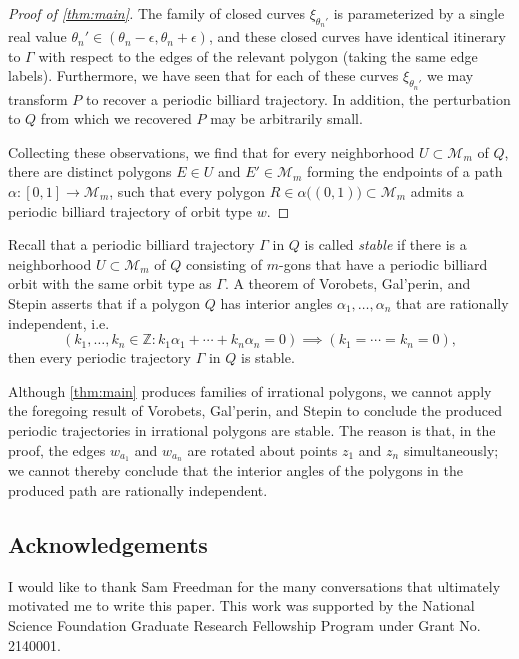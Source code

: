 \documentclass[12pt]{amsart}
\theoremstyle{theorem}
\theoremstyle{remark}
\numberwithin{equation}{section}
\newcommand{\ZZ}{\mathbb{Z}}
\newcommand{\cM}{\mathcal{M}}
\begin{document}
\begin{proof}[Proof of \cref{thm:main}]
The family of closed curves $\xi_{\theta_n'}$ is parameterized by a single real value $\theta_n' \in (\theta_n - \epsilon, \theta_n + \epsilon)$, and these closed curves have identical itinerary to $\Gamma$ with respect to the edges of the relevant polygon (taking the same edge labels). Furthermore, we have seen that for each of these curves $\xi_{\theta_n'}$ we may transform $P$ to recover a periodic billiard trajectory. In addition, the perturbation to $Q$ from which we recovered $P$ may be arbitrarily small.

Collecting these observations, we find that for every neighborhood $U \subset \cM_m$ of $Q$, there are distinct polygons $E \in U$ and $E' \in \cM_m$ forming the endpoints of a path $\alpha:[0,1]\rightarrow \cM_m$, such that every polygon $R \in \alpha\bigl((0,1)\bigr)\subset \cM_m$ admits a periodic billiard trajectory of orbit type $w$.
\end{proof}

Recall that a periodic billiard trajectory $\Gamma$ in $Q$ is called \emph{stable} if there is a neighborhood $U \subset \cM_m$ of $Q$ consisting of $m$-gons that have a periodic billiard orbit with the same orbit type as $\Gamma$.
A theorem of Vorobets, Gal'perin, and Stepin \cite{vorobets1992periodic} asserts that if a polygon $Q$ has interior angles $\alpha_1,\dots,\alpha_n$ that are rationally independent, i.e.
\[
(k_1,\dots,k_n \in \ZZ : k_1\alpha_1 + \cdots + k_n \alpha_n = 0) \implies (k_1=\cdots =k_n = 0),
\]
then every periodic trajectory $\Gamma$ in $Q$ is stable.

Although \cref{thm:main} produces families of irrational polygons, we cannot apply the foregoing result of Vorobets, Gal'perin, and Stepin to conclude the produced periodic trajectories in irrational polygons are stable.
The reason is that, in the proof, the edges $w_{a_1}$ and $w_{a_n}$ are rotated about points $z_1$ and $z_n$ simultaneously; we cannot thereby conclude that the interior angles of the polygons in the produced path are rationally independent.


\subsection*{Acknowledgements}
I would like to thank Sam Freedman for the many conversations that ultimately motivated me to write this paper.
This work was supported by the National Science Foundation Graduate Research Fellowship Program under Grant No. 2140001.




\end{document}
